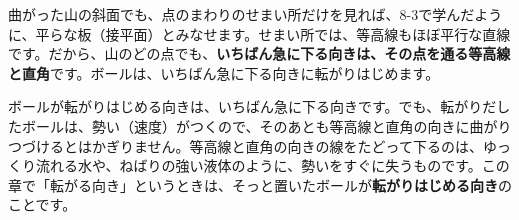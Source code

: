 \noindent 曲がった山の斜面でも、点のまわりのせまい所だけを見れば、8-3で学んだように、平らな板（接平面）とみなせます。せまい所では、等高線もほぼ平行な直線です。だから、山のどの点でも、\textbf{いちばん急に下る向きは、その点を通る等高線と直角}です。ボールは、いちばん急に下る向きに転がりはじめます。

\begin{seikaku}
ボールが転がりはじめる向きは、いちばん急に下る向きです。でも、転がりだしたボールは、勢い（速度）がつくので、そのあとも等高線と直角の向きに曲がりつづけるとはかぎりません。等高線と直角の向きの線をたどって下るのは、ゆっくり流れる水や、ねばりの強い液体のように、勢いをすぐに失うものです。この章で「転がる向き」というときは、そっと置いたボールが\textbf{転がりはじめる向き}のことです。
\end{seikaku}



